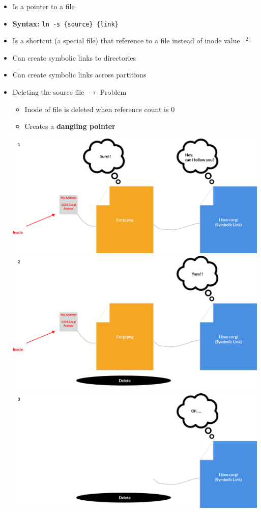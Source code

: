 \documentclass[12pt]{article}
\begin{document}
\begin{itemize}
    \item Is a pointer to a file
    \item \textbf{Syntax:} \texttt{ln -s \{source\} \{link\}}
    \item Is a shortcut (a special file) that reference to a file instead of inode value $^{[2]}$
    \item Can create symbolic links to directories
    \item Can create symbolic links across partitions
    \item Deleting the source file $\to$ Problem
    \begin{itemize}
        \item Inode of file is deleted when reference count is 0
        \item Creates a \textbf{dangling pointer}
    \end{itemize}

    \begin{center}
        \includegraphics[width=0.8\linewidth]{../images/midterm_4_solution_19.png}
        \includegraphics[width=0.8\linewidth]{../images/midterm_4_solution_20.png}
        \includegraphics[width=0.8\linewidth]{../images/midterm_4_solution_21.png}
    \end{center}
\end{itemize}
\end{document}
